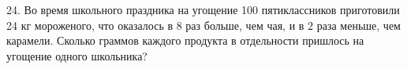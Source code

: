 24. Во время школьного праздника на угощение 100 пятиклассников приготовили 24 кг мороженого, что оказалось в 8 раз больше, чем чая, и в 2 раза меньше, чем карамели. Сколько граммов каждого продукта в отдельности пришлось на угощение одного школьника?\\
